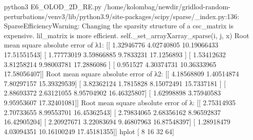 python3 E6_OLOD_2D_RE.py
/home/kolombag/newdir/gridlod-random-perturbations/venv3/lib/python3.9/site-packages/scipy/sparse/_index.py:136: SparseEfficiencyWarning: Changing the sparsity structure of a csc_matrix is expensive. lil_matrix is more efficient.
  self._set_arrayXarray_sparse(i, j, x)
Root mean square absolute error of λ1:
 [[ 1.32946776  4.02740805 10.19066433 17.51551543]
 [ 1.77773019  3.59866885  9.7833231  17.1256893 ]
 [ 1.53412632  3.81258214  9.98003781 17.2886086 ]
 [ 0.951527    4.30374731 10.36333965 17.58056407]]
Root mean square absolute error of λ2: 
 [[ 4.18568809  1.40514874  7.80297157 15.39329539]
 [ 3.82362124  1.7815828   8.15072491 15.7337181 ]
 [ 2.88693372  2.63121055  8.95704902 16.46325807]
 [ 1.62998898  3.75940583  9.95953607 17.32401081]]
Root mean square absolute error of λ: 
 [[ 2.75314935  2.70733655  8.99553701 16.45362543]
 [ 2.79834065  2.68356162  8.96592837 16.42905204]
 [ 2.20927671  3.22083694  9.46807963 16.87548397]
 [ 1.28918479  4.03094351 10.16100249 17.45181355]]
hplot [ 8 16 32 64]